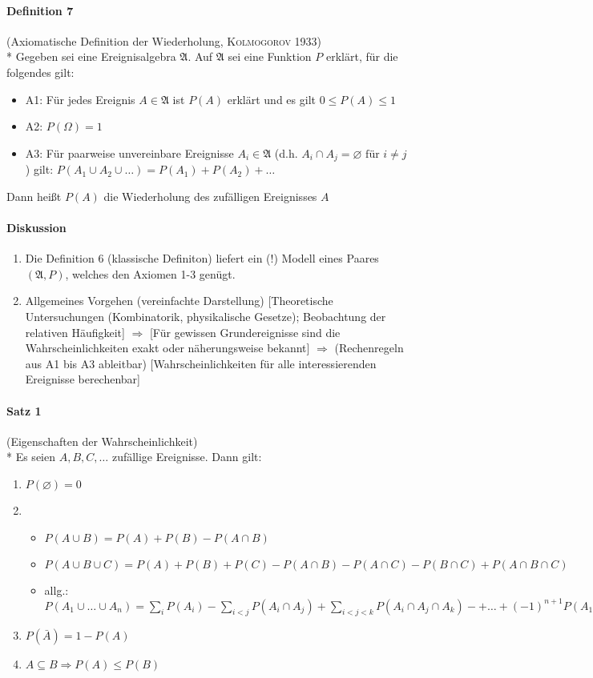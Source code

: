 \documentclass[a4paper]{scrartcl}
\begin{document}
\paragraph{Definition 7} (Axiomatische Definition der Wiederholung, \textsc{Kolmogorov} 1933)\\*
Gegeben sei eine Ereignisalgebra $\mathfrak{A}$. Auf $\mathfrak{A}$ sei eine Funktion $P$ erklärt, für die folgendes gilt:
\begin{itemize}
\item A1: Für jedes Ereignis $A \in \mathfrak{A}$ ist $P(A)$ erklärt und es gilt $0 \leq P(A) \leq 1$
\item A2: $P(\Omega) = 1$
\item A3: Für paarweise unvereinbare Ereignisse $A_i \in \mathfrak{A}$ (d.h. $A_i \cap A_j = \varnothing \text{ für } i \neq j$) gilt: $P(A_1 \cup A_2 \cup \dots) = P (A_1) + P(A_2) + \dots$
\end{itemize}
Dann heißt $P(A)$ die Wiederholung des zufälligen Ereignisses $A$

\paragraph{Diskussion}
\begin{enumerate}
\item Die Definition 6 (klassische Definiton) liefert ein (!) Modell eines Paares $(\mathfrak{A},P)$, welches den Axiomen 1-3 genügt.
\item Allgemeines Vorgehen (vereinfachte Darstellung)
[Theoretische Untersuchungen (Kombinatorik, physikalische Gesetze); Beobachtung der relativen Häufigkeit] $\Rightarrow$ [Für gewissen Grundereignisse sind die Wahrscheinlichkeiten exakt oder näherungsweise bekannt] $\Rightarrow$ (Rechenregeln aus A1 bis A3 ableitbar) [Wahrscheinlichkeiten für alle interessierenden Ereignisse berechenbar]
\end{enumerate}

\paragraph{Satz 1} (Eigenschaften der Wahrscheinlichkeit)\\*
Es seien $A,B,C,\dots$ zufällige Ereignisse. Dann gilt:
\begin{enumerate}
\item $P(\varnothing) = 0$
\item 
    \begin{itemize}
    \item $P(A \cup B) = P(A) + P(B) - P(A\cap B)$
    \item $P(A \cup B \cup C) = P(A) + P(B) + P(C) - P(A \cap B) - P(A \cap C) - P(B \cap C) + P(A \cap B \cap C)$
    \item allg.: $P(A_1 \cup \dots \cup A_n) = \sum\limits_i P(A_i) - \sum\limits_{i < j} P(A_i \cap A_j) + \sum\limits_{i < j <k} P (A_i \cap A_j \cap A_k) - + \dots + (-1)^{n+1} P(A_1 \cap A_2 \cap \dots \cap A_n)$
    \end{itemize}
\item $P(\bar{A}) = 1 - P(A)$
\item $A \subseteq B \Rightarrow P(A) \leq P(B)$
\end{enumerate}
\end{document}
